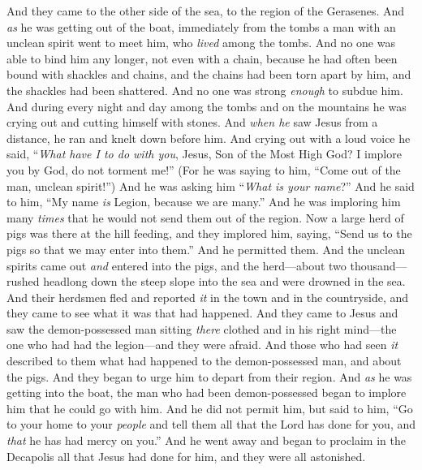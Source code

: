 \begin{biblechapter} %
 And they came to the other side of the sea, to the region of the Gerasenes.
\verse And \textit{as} he was getting out of the boat, immediately from the tombs a man with an unclean spirit went to meet him,
\verse who \textit{lived} among the tombs. And no one was able to bind him any longer, not even with a chain,
\verse because he had often been bound with shackles and chains, and the chains had been torn apart by him, and the shackles had been shattered. And no one was strong \textit{enough} to subdue him.
\verse And during every night and day among the tombs and on the mountains he was crying out and cutting himself with stones.
\verse And \textit{when he} saw Jesus from a distance, he ran and knelt down before him.
\verse And crying out with a loud voice he said, “\textit{What have I to do with you}, Jesus, Son of the Most High God? I implore you by God, do not torment me!”
\verse (For he was saying to him, “Come out of the man, unclean spirit!”)
\verse And he was asking him “\textit{What is your name}?” And he said to him, “My name \textit{is} Legion, because we are many.”
\verse And he was imploring him many \textit{times} that he would not send them out of the region.
\verse Now a large herd of pigs was there at the hill feeding,
\verse and they implored him, saying, “Send us to the pigs so that we may enter into them.”
\verse And he permitted them. And the unclean spirits came out \textit{and} entered into the pigs, and the herd—about two thousand—rushed headlong down the steep slope into the sea and were drowned in the sea.
\verse And their herdsmen fled and reported \textit{it} in the town and in the countryside, and they came to see what it was that had happened.
\verse And they came to Jesus and saw the demon-possessed man sitting \textit{there} clothed and in his right mind—the one who had had the legion—and they were afraid.
\verse And those who had seen \textit{it} described to them what had happened to the demon-possessed man, and about the pigs.
\verse And they began to urge him to depart from their region.
\verse And \textit{as} he was getting into the boat, the man who had been demon-possessed began to implore him that he could go with him.
\verse And he did not permit him, but said to him, “Go to your home to your \textit{people} and tell them all that the Lord has done for you, and \textit{that} he has had mercy on you.”
\verse And he went away and began to proclaim in the Decapolis all that Jesus had done for him, and they were all astonished.

\end{biblechapter}
